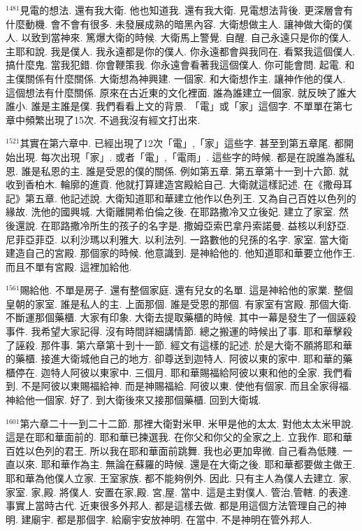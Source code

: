 \documentclass{book}
\begin{document}
$^{1481}$見電的想法.
還有我大衛.
他也知道我.
還有我大衛.
見電想法背後.
更深層會有什麼動機.
會不會有很多.
未發展成熟的暗黑內容.
大衛想做主人.
讓神做大衛的僕人.
以致到當神來.
篤爆大衛的時候.
大衛馬上警覺.
自醒.
自己永遠只是你的僕人.
主耶和說.
我是僕人.
我永遠都是你的僕人.
你永遠都會與我同在.
看緊我這個僕人.
搞什麼鬼.
當我犯錯.
你會鞭策我.
你永遠會看著我這個僕人.
你可能會問.
起電.
和主僕關係有什麼關係.
大衛想為神興建.
一個家.
和大衛想作主.
讓神作他的僕人.
這個想法有什麼關係.
原來在古近東的文化裡面.
誰為誰建立一個家.
就反映了誰大誰小.
誰是主誰是僕.
我們看看上文的背景.
「電」或「家」這個字.
不單單在第七章中頻繁出現了15次.
不過我沒有經文打出來.

$^{1521}$其實在第六章中.
已經出現了12次「電」,「家」這些字.
甚至到第五章尾.
都開始出現.
每次出現「家」.
或者「電」,「電雨」.
這些字的時候.
都是在說誰為誰私恩.
誰是私恩的主.
誰是受恩的僕的關係.
例如第五章.
第五章第十一到十六節.
就收到香柏木.
輪廓的進貢.
他就打算建造宮殿給自己.
大衛就這樣記述.
在《撒母耳記》第五章.
他記述說.
大衛知道耶和華建立他作以色列王.
又為自己百姓以色列的緣故.
洗他的國興城.
大衛離開希伯倫之後.
在耶路撒冷又立後妃.
建立了家室.
然後還說.
在耶路撒冷所生的孩子的名字是.
撒姆亞索巴拿丹索諾曼.
益核以利舒亞.
尼菲亞菲亞.
以利沙瑪以利雅大.
以利法列.
一路數他的兒孫的名字.
家室.
當大衛建造自己的宮殿.
那個家的時候.
他意識到.
是神給他的.
他知道耶和華要立他作王.
而且不單有宮殿.
這裡加給他.

$^{1561}$賜給他.
不單是房子.
還有整個家庭.
還有兒女的名單.
這是神給他的家業.
整個皇朝的家室.
誰是私人的主.
上面那個.
誰是受恩的那個.
有家室有宮殿.
那個大衛.
不斷運那個藥櫃.
大家有印象.
大衛去提取藥櫃的時候.
其中一幕是發生了一個誣殺事件.
我希望大家記得.
沒有時間詳細講情節.
總之搬運的時候出了事.
耶和華擊殺了誣殺.
那件事.
第六章第十到十一節.
經文有這樣的記述.
於是大衛不願將耶和華的藥櫃.
接進大衛城他自己的地方.
卻尊送到迦特人.
阿彼以東的家中.
耶和華的藥櫃停在.
迦特人阿彼以東家中.
三個月.
耶和華賜福給阿彼以東和他的全家.
我們看到.
不是阿彼以東賜福給神.
而是神賜福給.
阿彼以東.
使他有個家.
而且全家得福.
神給他一個家.
好了.
到大衛後來又接那個藥櫃.
回到大衛城.

$^{1601}$第六章二十一到二十二節.
那裡大衛對米甲.
米甲是他的太太.
對他太太米甲說.
這是在耶和華面前的.
耶和華已揀選我.
在你父和你父的全家之上.
立我作.
耶和華百姓以色列的君王.
所以我在耶和華面前跳舞.
我也必更加卑微.
自己看為低賤.
一直以來.
耶和華作為主.
無論在蘇羅的時候.
還是在大衛之後.
耶和華都要做主做王.
耶和華為他僕人立家.
王室家族.
都不能夠例外.
因此.
只有主人為僕人去建立.
家,家室.
家,殿.
將僕人.
安置在家,殿.
宮,屋.
當中.
這是主對僕人.
管治,管轄.
的表達.
事實上當時古代.
近東很多外邦人.
都是這樣去做.
都是用這個方法管理自己的神明.
建廟宇.
都是那個字.
給廟宇安放神明.
在當中.
不是神明在管外邦人.
\end{document}
